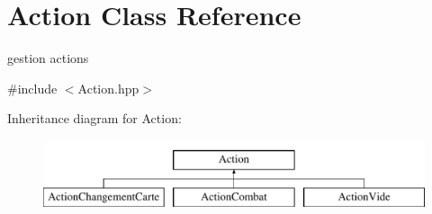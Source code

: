 \hypertarget{classAction}{\section{Action Class Reference}
\label{classAction}
}


gestion actions  




{\ttfamily \#include $<$Action.\-hpp$>$}

Inheritance diagram for Action\-:\begin{figure}[H]
\begin{center}
\leavevmode
\includegraphics[height=2.000000cm]{classAction}
\end{center}
\end{figure}
